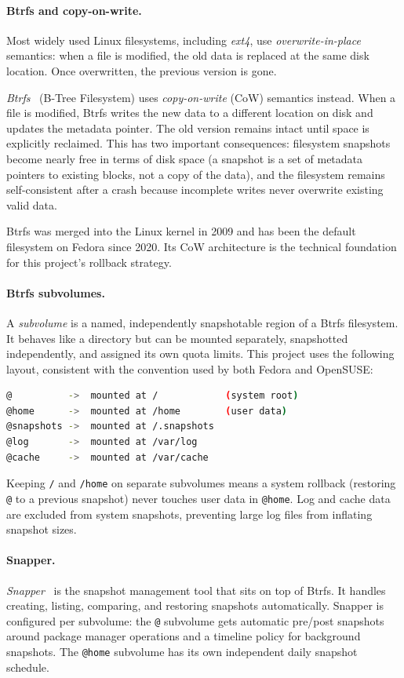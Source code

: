\paragraph{Btrfs and copy-on-write.}
Most widely used Linux filesystems, including \emph{ext4}, use
\emph{overwrite-in-place} semantics: when a file is modified, the old data is
replaced at the same disk location. Once overwritten, the previous version is
gone.

\emph{Btrfs}~\cite{archwiki:btrfs}
(B-Tree Filesystem) uses \emph{copy-on-write} (CoW) semantics instead. When a
file is modified, Btrfs writes the new data to a different location on disk and
updates the metadata pointer. The old version remains intact until space is
explicitly reclaimed. This has two important consequences: filesystem snapshots
become nearly free in terms of disk space (a snapshot is a set of metadata
pointers to existing blocks, not a copy of the data), and the filesystem remains
self-consistent after a crash because incomplete writes never overwrite existing
valid data.

Btrfs was merged into the Linux kernel in 2009 and has been the default
filesystem on Fedora since 2020. Its CoW architecture is the technical
foundation for this project's rollback strategy.

\paragraph{Btrfs subvolumes.}
A \emph{subvolume} is a named, independently snapshotable region of a Btrfs
filesystem. It behaves like a directory but can be mounted separately, snapshotted
independently, and assigned its own quota limits. This project uses the following
layout, consistent with the convention used by both Fedora and OpenSUSE:

\begin{lstlisting}[language=bash]
@          ->  mounted at /            (system root)
@home      ->  mounted at /home        (user data)
@snapshots ->  mounted at /.snapshots
@log       ->  mounted at /var/log
@cache     ->  mounted at /var/cache
\end{lstlisting}

Keeping \texttt{/} and \texttt{/home} on separate subvolumes means a system
rollback (restoring \texttt{@} to a previous snapshot) never touches user data
in \texttt{@home}. Log and cache data are excluded from system snapshots,
preventing large log files from inflating snapshot sizes.

\paragraph{Snapper.}
\emph{Snapper}~\cite{archwiki:snapper}
is the snapshot management tool that sits on top of Btrfs. It handles creating,
listing, comparing, and restoring snapshots automatically. Snapper is configured
per subvolume: the \texttt{@} subvolume gets automatic pre/post snapshots around
package manager operations and a timeline policy for background snapshots. The
\texttt{@home} subvolume has its own independent daily snapshot schedule.

